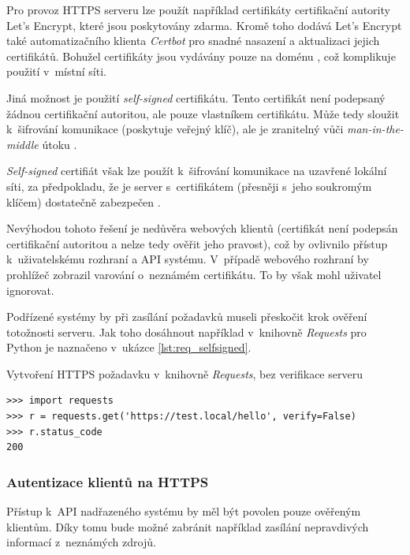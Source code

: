 Pro provoz HTTPS serveru lze použít například certifikáty certifikační autority Let's Encrypt, které jsou poskytovány  zdarma. Kromě toho dodává Let's Encrypt také automatizačního klienta \textit{Certbot} \cite{certbot} pro snadné nasazení a aktualizaci jejich certifikátů. Bohužel certifikáty jsou vydávány pouze na doménu \cite{lets_encrypt_faq}, což komplikuje použití v~místní síti.

Jiná možnost je použití \textit{self-signed} certifikátu. Tento certifikát není podepsaný žádnou certifikační autoritou, ale pouze vlastníkem certifikátu. Může tedy sloužit k~šifrování komunikace (poskytuje veřejný klíč), ale je zranitelný vůči \textit{man-in-the-middle} útoku \cite{cert_wallen}.

\textit{Self-signed} certifiát však lze použít k~šifrování komunikace na uzavřené lokální síti, za předpokladu, že je server s~certifikátem (přesněji s~jeho soukromým klíčem) dostatečně zabezpečen \cite{cert_wallen}. 

Nevýhodou tohoto řešení je nedůvěra webových klientů (certifikát není podepsán certifikační autoritou a nelze tedy ověřit jeho pravost), což by ovlivnilo přístup k~uživatelskému rozhraní a API systému. V~případě webového rozhraní by prohlížeč zobrazil varování o~neznámém certifikátu. To by však mohl uživatel ignorovat. 

Podřízené systémy by při zasílání požadavků museli přeskočit krok ověření totožnosti serveru. Jak toho dosáhnout například v~knihovně \textit{Requests} pro Python je naznačeno v~ukázce \ref{lst:req_selfsigned}.

\begin{listing}[htbp]
\caption{\label{lst:req_selfsigned} Vytvoření HTTPS požadavku v~knihovně \textit{Requests}, bez verifikace serveru}
\begin{verbatim}
>>> import requests
>>> r = requests.get('https://test.local/hello', verify=False)
>>> r.status_code
200
\end{verbatim}
\end{listing}

\subsubsection{Autentizace klientů na HTTPS}

Přístup k~API nadřazeného systému by měl být povolen pouze ověřeným klientům. Díky tomu bude možné zabránit například zasílání nepravdivých informací z~neznámých zdrojů.

